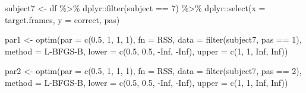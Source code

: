 \documentclass[
]{article}
\newenvironment{Shaded}{\begin{snugshade}}{\end{snugshade}}
\newcommand{\AttributeTok}[1]{\textcolor[rgb]{0.77,0.63,0.00}{#1}}
\newcommand{\ConstantTok}[1]{\textcolor[rgb]{0.00,0.00,0.00}{#1}}
\newcommand{\DecValTok}[1]{\textcolor[rgb]{0.00,0.00,0.81}{#1}}
\newcommand{\FloatTok}[1]{\textcolor[rgb]{0.00,0.00,0.81}{#1}}
\newcommand{\FunctionTok}[1]{\textcolor[rgb]{0.00,0.00,0.00}{#1}}
\newcommand{\NormalTok}[1]{#1}
\newcommand{\OtherTok}[1]{\textcolor[rgb]{0.56,0.35,0.01}{#1}}
\newcommand{\SpecialCharTok}[1]{\textcolor[rgb]{0.00,0.00,0.00}{#1}}
\newcommand{\StringTok}[1]{\textcolor[rgb]{0.31,0.60,0.02}{#1}}
\begin{document}
\begin{Shaded}
\begin{Highlighting}[]
\NormalTok{subject7 }\OtherTok{\textless{}{-}}\NormalTok{ df }\SpecialCharTok{\%\textgreater{}\%}
\NormalTok{  dplyr}\SpecialCharTok{::}\FunctionTok{filter}\NormalTok{(subject }\SpecialCharTok{==} \StringTok{\textquotesingle{}7\textquotesingle{}}\NormalTok{) }\SpecialCharTok{\%\textgreater{}\%} 
\NormalTok{  dplyr}\SpecialCharTok{::}\FunctionTok{select}\NormalTok{(}\StringTok{\textquotesingle{}x\textquotesingle{}} \OtherTok{=}\NormalTok{ target.frames, }\StringTok{\textquotesingle{}y\textquotesingle{}} \OtherTok{=}\NormalTok{ correct, pas)}


\NormalTok{par1 }\OtherTok{\textless{}{-}} \FunctionTok{optim}\NormalTok{(}\AttributeTok{par =} \FunctionTok{c}\NormalTok{(}\FloatTok{0.5}\NormalTok{, }\DecValTok{1}\NormalTok{, }\DecValTok{1}\NormalTok{, }\DecValTok{1}\NormalTok{),}
      \AttributeTok{fn =}\NormalTok{ RSS, }
      \AttributeTok{data =} \FunctionTok{filter}\NormalTok{(subject7, pas }\SpecialCharTok{==} \StringTok{\textquotesingle{}1\textquotesingle{}}\NormalTok{), }
      \AttributeTok{method =} \StringTok{\textquotesingle{}L{-}BFGS{-}B\textquotesingle{}}\NormalTok{, }
      \AttributeTok{lower =} \FunctionTok{c}\NormalTok{(}\FloatTok{0.5}\NormalTok{, }\FloatTok{0.5}\NormalTok{, }\SpecialCharTok{{-}}\ConstantTok{Inf}\NormalTok{, }\SpecialCharTok{{-}}\ConstantTok{Inf}\NormalTok{), }
      \AttributeTok{upper =} \FunctionTok{c}\NormalTok{(}\DecValTok{1}\NormalTok{, }\DecValTok{1}\NormalTok{, }\ConstantTok{Inf}\NormalTok{, }\ConstantTok{Inf}\NormalTok{))}

\NormalTok{par2 }\OtherTok{\textless{}{-}} \FunctionTok{optim}\NormalTok{(}\AttributeTok{par =} \FunctionTok{c}\NormalTok{(}\FloatTok{0.5}\NormalTok{, }\DecValTok{1}\NormalTok{, }\DecValTok{1}\NormalTok{, }\DecValTok{1}\NormalTok{),}
      \AttributeTok{fn =}\NormalTok{ RSS, }
      \AttributeTok{data =} \FunctionTok{filter}\NormalTok{(subject7, pas }\SpecialCharTok{==} \StringTok{\textquotesingle{}2\textquotesingle{}}\NormalTok{), }
      \AttributeTok{method =} \StringTok{\textquotesingle{}L{-}BFGS{-}B\textquotesingle{}}\NormalTok{, }
      \AttributeTok{lower =} \FunctionTok{c}\NormalTok{(}\FloatTok{0.5}\NormalTok{, }\FloatTok{0.5}\NormalTok{, }\SpecialCharTok{{-}}\ConstantTok{Inf}\NormalTok{, }\SpecialCharTok{{-}}\ConstantTok{Inf}\NormalTok{), }
      \AttributeTok{upper =} \FunctionTok{c}\NormalTok{(}\DecValTok{1}\NormalTok{, }\DecValTok{1}\NormalTok{, }\ConstantTok{Inf}\NormalTok{, }\ConstantTok{Inf}\NormalTok{))}


\end{Highlighting}
\end{Shaded}
\end{document}
